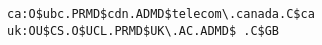 \small\begin{verbatim}
ca:O$ubc.PRMD$cdn.ADMD$telecom\.canada.C$ca
uk:OU$CS.O$UCL.PRMD$UK\.AC.ADMD$ .C$GB
\end{verbatim}
